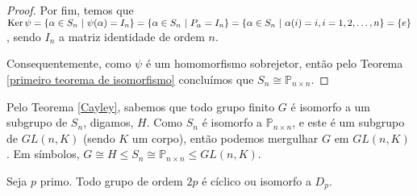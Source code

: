 \begin{proof}
		\par\vspace{0.3cm} Por fim, temos que $\operatorname{Ker}\psi = \{ \alpha\in S_n \ | \ \psi(\alpha) = I_n \} 
		= \{ \alpha\in S_n \ | \ P_{\alpha} = I_n \} = \{ \alpha\in S_n \ | \ \alpha(i) = i, i=1,2,\dots,n \} = \{e\}$,
		sendo $I_n$ a matriz identidade de ordem $n$.
		
		\par\vspace{0.3cm} Consequentemente, como $\psi$ é um homomorfismo sobrejetor, então pelo 
		Teorema \ref{primeiro teorema de isomorfismo} concluímos que $S_n\cong\mathbb{P}_{n\times n}$.
	\end{proof}
	\begin{remark}
		Pelo Teorema \ref{Cayley}, sabemos que todo grupo finito $G$ é isomorfo a um subgrupo de $S_n$, 
		digamos, $H$. Como $S_n$ é isomorfo a $\mathbb{P}_{n\times n}$, e este é um subgrupo de $GL(n,K)$ 
		(sendo $K$ um corpo), então podemos mergulhar $G$ em $GL(n,K)$. Em símbolos, 
		$G\cong H\leq S_n\cong\mathbb{P}_{n\times n}\leq GL(n,K)$.
	\end{remark}
	\begin{theorem}
	\label{grupos de ordem 2p}
		Seja $p$ primo. Todo grupo de ordem $2p$ é cíclico ou isomorfo a $D_p$.
	\end{theorem}
